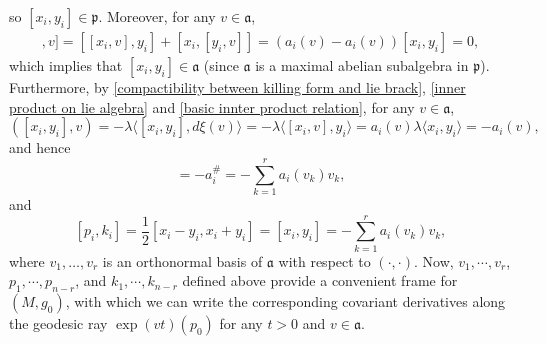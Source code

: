 \documentclass[12pt]{amsart}
\begin{document}
so $[x_i,y_i]\in\mathfrak{p}$. Moreover, for any $v\in\mathfrak{a}$,
\begin{align*}
    [[x_i, y_i], v] = [[x_i, v], y_i] + [x_i, [y_i,v]] = (a_i(v) - a_i(v))[x_i, y_i] = 0, 
\end{align*}
which implies that $[x_{i},y_{i}]\in\mathfrak{a}$ (since $\mathfrak{a}$ is a maximal abelian subalgebra in $\mathfrak{p}$). Furthermore, by \eqref{compactibility between killing form and lie brack}, \eqref{inner product on lie algebra} and \eqref{basic innter product relation}, for any $v \in \mathfrak{a}$, 
\begin{equation}
	([x_i, y_i], v) = -\lambda\langle [x_{i}, y_{i}], d\xi(v) \rangle = -\lambda\langle [x_{i}, v], y_{i} \rangle = a_{i}(v) \lambda\langle x_{i}, y_{i} \rangle = -a_{i}(v), 
\end{equation}
and hence
\begin{equation}
	[x_{i}, y_{i}] = -a_{i}^{\#} = -\sum_{k = 1}^{r} a_i (v_k) v_k, 
\end{equation}
and 
\begin{equation}\label{basic frame relation 1}
    [p_i, k_i] = \frac{1}{2}[x_i - y_i, x_i + y_i] = [x_i,y_i] = -\sum_{k = 1}^{r}a_i(v_k)v_k,
\end{equation}
where $v_{1},\dots,v_{r}$ is an orthonormal basis of $\mathfrak{a}$ with respect to $(\cdot,\cdot)$. Now, $v_1, \cdots, v_{r}$, $p_1,\cdots, p_{n - r}$, and $k_1, \cdots, k_{n - r}$ defined above provide a convenient frame for $(M, g_0)$, with which we can write the corresponding covariant derivatives along the geodesic ray $\exp(vt)(p_0)$ for any $t > 0$ and $v \in \mathfrak{a}$. 
\end{document}

